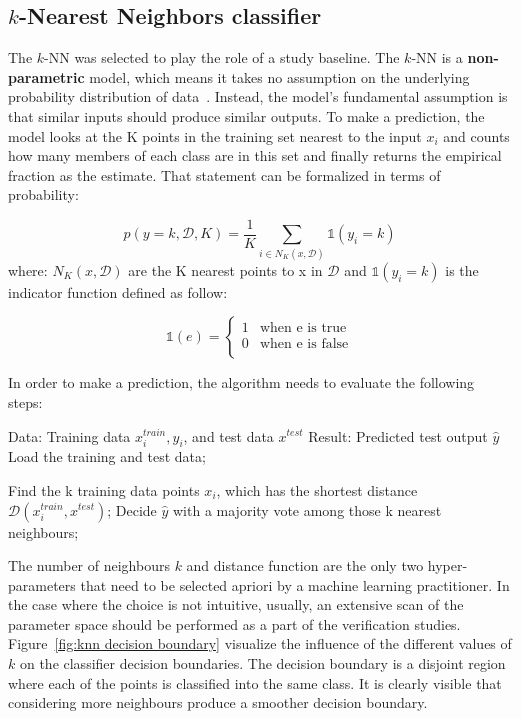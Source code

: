 \subsection{$k$-Nearest Neighbors classifier}
\label{sec:knn}
The $k$-NN was selected to play the role of a study baseline. The $k$-NN  is a \textbf{non-parametric} model, which means it takes no assumption on the underlying probability distribution of data~\cite{knn}. 
Instead, the model's fundamental assumption is that similar inputs should produce similar outputs. To make a prediction, the model looks at the K points in the training set nearest to the input $x_i$ and counts how many members of each class are in this set and finally returns the empirical fraction as the estimate. That statement can be formalized in terms of probability:  

\begin{equation}
p(y=k,\mathcal{D}, K) = \frac{1}{K} \sum_{i\in N_K(x,\mathcal{D})} \mathds{1}(y_i=k)
\end{equation}
where: 
$N_K(x,\mathcal{D})$ are the K nearest points to x in $\mathcal{D}$ and $\mathds{1}(y_i=k)$ is the indicator function defined as follow: 

\begin{equation}
    \mathds{1}(e) = \left\{ \begin{array}{ll}
1 & \textrm{when e is true}\\
0 & \textrm{when e is false}\\
\end{array} \right.
\end{equation}

In order to make a prediction, the algorithm needs to evaluate the following steps: 
\begin{algorithm}[caption={k-nearest neighbour, $k$-NN }, label={knn}]
Data: Training data ${x^{train}_{i} , y_{i}}$, and test data ${x^{test}}$
Result: Predicted test output $\hat{y}$
Load the training and test data;

Find the k training data points $x_i$, which has the shortest distance$\mathcal{D}(x^{train}_i, x^{test})$;
Decide $\hat{y}$ with a majority vote among those k nearest neighbours;  
\end{algorithm}

The number of neighbours $k$ and distance function are the only two hyper-parameters that need to be selected apriori by a machine learning practitioner. In the case where the choice is not intuitive, usually, an extensive scan of the parameter space should be performed as a part of the verification studies. Figure~\ref{fig:knn decision boundary} visualize the influence of the different values of $k$ on the classifier decision boundaries. The decision boundary is a disjoint region where each of the points is classified into the same class. It is clearly visible that considering more neighbours produce a smoother decision boundary. 


